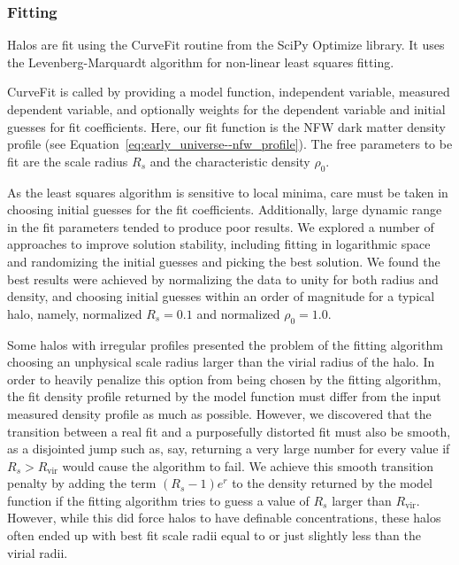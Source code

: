 \subsubsection{Fitting}
\label{subsubsec:analysis--profile_fitting--fitting}


Halos are fit using the CurveFit routine from the SciPy Optimize library.  It uses the Levenberg-Marquardt algorithm \citep{1963SIAM...11...431} for non-linear least squares fitting.

CurveFit is called by providing a model function, independent variable, measured dependent variable, and optionally weights for the dependent variable and initial guesses for fit coefficients.  Here, our fit function is the NFW dark matter density profile (see Equation~\ref{eq:early_universe--nfw_profile}).  The free parameters to be fit are the scale radius $R_{s}$ and the characteristic density $\rho_{0}$.

As the least squares algorithm is sensitive to local minima, care must be taken in choosing initial guesses for the fit coefficients.  Additionally, large dynamic range in the fit parameters tended to produce poor results.  We explored a number of approaches to improve solution stability, including fitting in logarithmic space and randomizing the initial guesses and picking the best solution.  We found the best results were achieved by normalizing the data to unity for both radius and density, and choosing initial guesses within an order of magnitude for a typical halo, namely, normalized $R_{s} = 0.1$ and normalized $\rho_{0} = 1.0$.

Some halos with irregular profiles presented the problem of the fitting algorithm choosing an unphysical scale radius larger than the virial radius of the halo.  In order to heavily penalize this option from being chosen by the fitting algorithm, the fit density profile returned by the model function must differ from the input measured density profile as much as possible.  However, we discovered that the transition between a real fit and a purposefully distorted fit must also be smooth, as a disjointed jump such as, say, returning a very large number for every value if $R_{s} > R_{\mathrm{vir}}$ would cause the algorithm to fail.  We achieve this smooth transition penalty by adding the term $(R_{s} - 1) e^{r}$ to the density returned by the model function if the fitting algorithm tries to guess a value of $R_{s}$ larger than $R_{\mathrm{vir}}$.  However, while this did force halos to have definable concentrations, these halos often ended up with best fit scale radii equal to or just slightly less than the virial radii.

